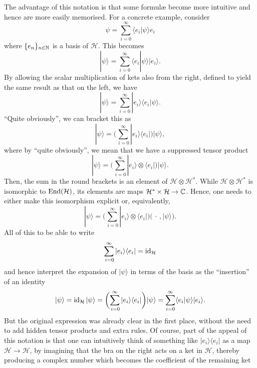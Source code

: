 The advantage of this notation is that some formul{\ae} become more intuitive and hence are more easily memorised. For a concrete example, consider
\begin{equation*}
\psi = \sum_{i=0}^{\infty}\langle e_i | \psi \rangle e_i
\end{equation*}
where $\{e_n\}_{n\in\mathbb{N}}$ is a basis of $\mathcal{H}$. This becomes
\begin{equation*}
|\psi \rangle
= \sum_{i=0}^{\infty}\langle e_i | \psi \rangle |e_i\rangle.
\end{equation*}
By allowing the scalar multiplication of kets also from the
right, defined to yield the same result as that on the left, we have
\begin{equation*}
|\psi \rangle
 = \sum_{i=0}^{\infty}|e_i\rangle\langle e_i | \psi \rangle .
\end{equation*}
``Quite obviously'', we can bracket this as
\begin{equation*}
|\psi \rangle
 = \biggl(\sum_{\,i=0}^{\infty}|e_i\rangle\langle e_i |\biggr) |\psi \rangle ,
\end{equation*}
where by ``quite obviously'', we mean that we have a suppressed tensor
product
\begin{equation*}
|\psi \rangle
 = \biggl(\sum_{\,i=0}^{\infty}|e_i\rangle\otimes\langle e_i |\biggr) |\psi \rangle .
\end{equation*}
Then, the sum in the round brackets is an element of $\mathcal{H}\otimes\mathcal{H}^*$. While $\mathcal{H}\otimes\mathcal{H}^*$ is isomorphic to $\operatorname{End}(\mathcal{H})$, its elements are maps $\mathcal{H}^*\times\mathcal{H}\to\mathbb{C}$. Hence, one needs to either make this isomorphism explicit or, equivalently,
\begin{equation*}
|\psi \rangle
 = \biggl(\sum_{\,i=0}^{\infty}|e_i\rangle\otimes\langle e_i |\biggr) \bigl(\,\cdot\, , |\psi \rangle \bigr).
\end{equation*}
All of this to be able to write
\begin{equation*}
\sum_{\,i=0}^{\infty}|e_i\rangle\langle e_i | = \operatorname{id}_{\mathcal{H}}
\end{equation*}
and hence interpret the expansion of $|\psi\rangle$ in terms of the basis as the ``insertion'' of an identity
\begin{equation*}
|\psi\rangle = \operatorname{id}_{\mathcal{H}}|\psi\rangle =  \biggl(\sum_{\,i=0}^{\infty}|e_i\rangle\langle e_i |\biggr) |\psi \rangle = \sum_{i=0}^{\infty}\langle e_i | \psi \rangle |e_i\rangle.
\end{equation*}
But the original expression was already clear in the first place, without the need to add hidden tensor products and extra rules. Of course, part of the appeal of this notation is that one can intuitively think of something like $|e_i\rangle\langle e_i |$ as a map $\mathcal{H}\to\mathcal{H}$, by imagining that the bra on the right acts on a ket in $\mathcal{H}$, thereby producing a complex number which becomes the coefficient of the remaining ket
